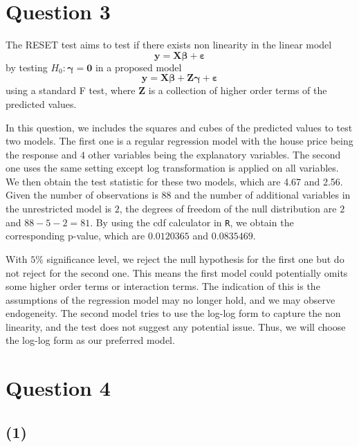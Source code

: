 \documentclass[
]{article}
\begin{document}
\hypertarget{question-3}{%
\section{Question 3}\label{question-3}}

The RESET test aims to test if there exists non linearity in the linear
model
\[\boldsymbol{y}=\boldsymbol{X}\boldsymbol{\beta}+\boldsymbol{\varepsilon}\]
by testing \(H_0: \boldsymbol{\gamma} = \boldsymbol{0}\) in a proposed
model
\[\boldsymbol{y}=\boldsymbol{X}\boldsymbol{\beta}+\boldsymbol{Z}\boldsymbol{\gamma}+\boldsymbol{\varepsilon}\]
using a standard F test, where \(\boldsymbol{Z}\) is a collection of
higher order terms of the predicted values.

In this question, we includes the squares and cubes of the predicted
values to test two models. The first one is a regular regression model
with the house price being the response and \(4\) other variables being
the explanatory variables. The second one uses the same setting except
log transformation is applied on all variables. We then obtain the test
statistic for these two models, which are 4.67 and 2.56. Given the
number of observations is \(88\) and the number of additional variables
in the unrestricted model is \(2\), the degrees of freedom of the null
distribution are \(2\) and \(88-5-2=81\). By using the cdf calculator in
\texttt{R}, we obtain the corresponding p-value, which are \(0.0120365\)
and \(0.0835469\).

With \(5\)\% significance level, we reject the null hypothesis for the
first one but do not reject for the second one. This means the first
model could potentially omits some higher order terms or interaction
terms. The indication of this is the assumptions of the regression model
may no longer hold, and we may observe endogeneity. The second model
tries to use the log-log form to capture the non linearity, and the test
does not suggest any potential issue. Thus, we will choose the log-log
form as our preferred model.

\hypertarget{question-4}{%
\section{Question 4}\label{question-4}}

\hypertarget{section}{%
\subsection{(1)}\label{section}}
\end{document}
